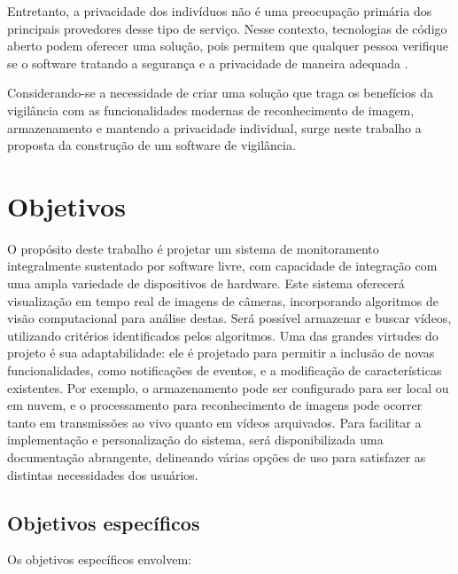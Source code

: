 \documentclass[12pt, %
openright, 
oneside, %
a4paper,    %
brazil]{facom-ufu-abntex2}
\begin{document}
Entretanto, a privacidade dos indivíduos não é uma preocupação primária dos
principais provedores desse tipo de serviço. Nesse contexto, tecnologias de
código aberto podem oferecer uma solução, pois permitem que qualquer pessoa
verifique se o software tratando a segurança e a privacidade de maneira
adequada \cite{mardjan2016open}.

Considerando-se a necessidade de criar uma solução que traga os benefícios da
vigilância com as funcionalidades modernas de reconhecimento de imagem,
armazenamento e mantendo a privacidade individual, surge neste trabalho a
proposta da construção de um software de vigilância.

\section{Objetivos}

O propósito deste trabalho é projetar um sistema de monitoramento integralmente
sustentado por software livre, com capacidade de integração com uma ampla
variedade de dispositivos de hardware. Este sistema oferecerá visualização em
tempo real de imagens de câmeras, incorporando algoritmos de visão
computacional para análise destas. Será possível armazenar e buscar vídeos,
utilizando critérios identificados pelos algoritmos. Uma das grandes virtudes
do projeto é sua adaptabilidade: ele é projetado para permitir a inclusão de
novas funcionalidades, como notificações de eventos, e a modificação de
características existentes. Por exemplo, o armazenamento pode ser configurado
para ser local ou em nuvem, e o processamento para reconhecimento de imagens
pode ocorrer tanto em transmissões ao vivo quanto em vídeos arquivados. Para
facilitar a implementação e personalização do sistema, será disponibilizada uma
documentação abrangente, delineando várias opções de uso para satisfazer as
distintas necessidades dos usuários.

\subsection{Objetivos específicos}

Os objetivos específicos envolvem:
\end{document}
